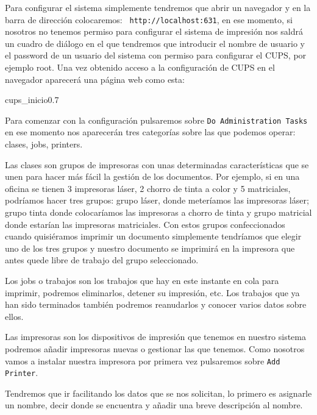 Para  configurar  el  sistema   simplemente  tendremos  que  abrir  un
navegador   y   en   la   barra   de   dirección   colocaremos:   {\tt
http://localhost:631}, en ese momento,  si nosotros no tenemos permiso
para  configurar el  sistema  de  impresión nos  saldrá  un cuadro  de
diálogo en el  que tendremos que introducir el nombre  de usuario y el
password  de un  usuario del  sistema con  permiso para  configurar el
CUPS, por ejemplo root. Una vez  obtenido acceso a la configuración de
CUPS en el navegador aparecerá una página web como esta:

\begin{figura}{cups_inicio}{0.7}
\caption{Página web que CUPS sirve en el puerto 631}
\end{figura}

Para  comenzar   con  la   configuración  pulsaremos  sobre   {\tt  Do
Administration Tasks}  en ese  momento nos aparecerán  tres categorías
sobre las que podemos operar: clases, jobs, printers.

Las   clases  son   grupos   de  impresoras   con  unas   determinadas
características que  se unen para  hacer más  fácil la gestión  de los
documentos.  Por ejemplo,  si en  una oficina  se tienen  3 impresoras
láser, 2 chorro de tinta a color y 5 matriciales, podríamos hacer tres
grupos:  grupo láser,  donde  meteríamos las  impresoras láser;  grupo
tinta  donde colocaríamos  las impresoras  a chorro  de tinta  y grupo
matricial donde estarían las  impresoras matriciales. Con estos grupos
confeccionados  cuando quisiéramos  imprimir un  documento simplemente
tendríamos que  elegir uno de los  tres grupos y nuestro  documento se
imprimirá en la  impresora que antes quede libre de  trabajo del grupo
seleccionado.

Los jobs o trabajos son los trabajos  que hay en este instante en cola
para imprimir,  podremos eliminarlos,  detener su impresión,  etc. Los
trabajos que  ya han  sido terminados  también podremos  reanudarlos y
conocer varios datos sobre ellos.

Las  impresoras  son los  dispositivos  de  impresión que  tenemos  en
nuestro sistema podremos añadir impresoras  nuevas o gestionar las que
tenemos. Como nosotros vamos a  instalar nuestra impresora por primera
vez pulsaremos sobre {\tt Add Printer}.

Tendremos  que ir  facilitando  los  datos que  se  nos solicitan,  lo
primero es asignarle un nombre, decir  donde se encuentra y añadir una
breve descripción al nombre.

